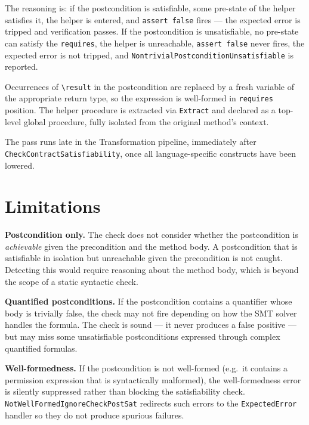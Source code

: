 \documentclass[9pt,a4paper,twocolumn]{article}
\begin{document}
The reasoning is: if the postcondition is satisfiable, some
pre-state of the helper satisfies it, the helper is entered, and
\texttt{assert false} fires — the expected error is tripped and
verification passes. If the postcondition is unsatisfiable, no
pre-state can satisfy the \texttt{requires}, the helper is
unreachable, \texttt{assert false} never fires, the expected
error is not tripped, and \texttt{NontrivialPostconditionUnsatisfiable}
is reported.

Occurrences of \texttt{\textbackslash result} in the postcondition
are replaced by a fresh variable of the appropriate return type,
so the expression is well-formed in \texttt{requires} position.
The helper procedure is extracted via \texttt{Extract} and
declared as a top-level global procedure, fully isolated from
the original method's context.

The pass runs late in the Transformation pipeline, immediately
after \texttt{CheckContractSatisfiability}, once all
language-specific constructs have been lowered.

\section{Limitations}

\textbf{Postcondition only.} The check does not consider whether
the postcondition is \emph{achievable} given the precondition and
the method body. A postcondition that is satisfiable in isolation
but unreachable given the precondition is not caught. Detecting
this would require reasoning about the method body, which is
beyond the scope of a static syntactic check.

\textbf{Quantified postconditions.} If the postcondition contains
a quantifier whose body is trivially false, the check may not fire
depending on how the SMT solver handles the formula. The check
is sound — it never produces a false positive — but may miss some
unsatisfiable postconditions expressed through complex quantified
formulas.

\textbf{Well-formedness.} If the postcondition is not
well-formed (e.g.\ it contains a permission expression that is
syntactically malformed), the well-formedness error is silently
suppressed rather than blocking the satisfiability check.
\texttt{NotWellFormedIgnoreCheckPostSat} redirects such errors
to the \texttt{ExpectedError} handler so they do not produce
spurious failures.

\end{document}
